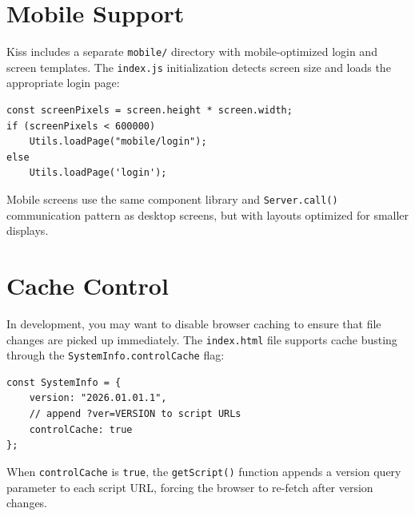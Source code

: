 \section{Mobile Support}
\label{sec:fe-mobile}

Kiss includes a separate \texttt{mobile/} directory with mobile-optimized login and screen templates.  The \texttt{index.js} initialization detects screen size and loads the appropriate login page:

\begin{lstlisting}[style=javascript]
const screenPixels = screen.height * screen.width;
if (screenPixels < 600000)
    Utils.loadPage("mobile/login");
else
    Utils.loadPage('login');
\end{lstlisting}

\noindent
Mobile screens use the same component library and \texttt{Server.call()} communication pattern as desktop screens, but with layouts optimized for smaller displays.

\section{Cache Control}
\label{sec:fe-cache}

In development, you may want to disable browser caching to ensure that file changes are picked up immediately.  The \texttt{index.html} file supports cache busting through the \texttt{SystemInfo.controlCache} flag:

\begin{lstlisting}[style=javascript]
const SystemInfo = {
    version: "2026.01.01.1",
    // append ?ver=VERSION to script URLs
    controlCache: true
};
\end{lstlisting}

\noindent
When \texttt{controlCache} is \texttt{true}, the \texttt{getScript()} function appends a version query parameter to each script URL, forcing the browser to re-fetch after version changes.
